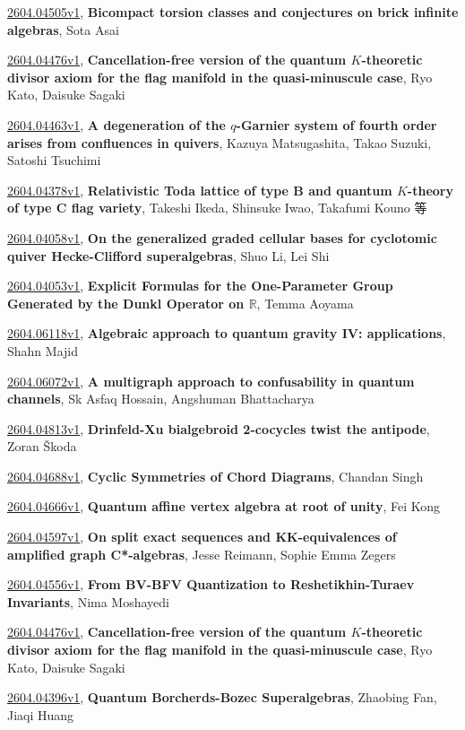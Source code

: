 \documentclass[9pt, a4paper]{article}
\theoremstyle{plain}
\theoremstyle{definition}
\theoremstyle{remark}
\newcommand{\arxiv}[3]{\href{https://arxiv.org/abs/#1}{#1}, \textbf{\textcolor{arxivblue}{#2}}, #3}
\begin{document}
\arxiv{2604.04505v1}{Bicompact torsion classes and conjectures on brick infinite algebras}{Sota Asai}

\arxiv{2604.04476v1}{Cancellation-free version of the quantum $K$-theoretic divisor axiom for the flag manifold in the quasi-minuscule case}{Ryo Kato, Daisuke Sagaki}

\arxiv{2604.04463v1}{A degeneration of the $q$-Garnier system of fourth order arises from confluences in quivers}{Kazuya Matsugashita, Takao Suzuki, Satoshi Tsuchimi}

\arxiv{2604.04378v1}{Relativistic Toda lattice of type B and quantum $K$-theory of type C flag variety}{Takeshi Ikeda, Shinsuke Iwao, Takafumi Kouno 等}

\arxiv{2604.04058v1}{On the generalized graded cellular bases for cyclotomic quiver Hecke-Clifford superalgebras}{Shuo Li, Lei Shi}

\arxiv{2604.04053v1}{Explicit Formulas for the One-Parameter Group Generated by the Dunkl Operator on $\mathbb{R}$}{Temma Aoyama}

\arxiv{2604.06118v1}{Algebraic approach to quantum gravity IV: applications}{Shahn Majid}

\arxiv{2604.06072v1}{A multigraph approach to confusability in quantum channels}{Sk Asfaq Hossain, Angshuman Bhattacharya}

\arxiv{2604.04813v1}{Drinfeld-Xu bialgebroid 2-cocycles twist the antipode}{Zoran Škoda}

\arxiv{2604.04688v1}{Cyclic Symmetries of Chord Diagrams}{Chandan Singh}

\arxiv{2604.04666v1}{Quantum affine vertex algebra at root of unity}{Fei Kong}

\arxiv{2604.04597v1}{On split exact sequences and KK-equivalences of amplified graph C*-algebras}{Jesse Reimann, Sophie Emma Zegers}

\arxiv{2604.04556v1}{From BV-BFV Quantization to Reshetikhin-Turaev Invariants}{Nima Moshayedi}

\arxiv{2604.04476v1}{Cancellation-free version of the quantum $K$-theoretic divisor axiom for the flag manifold in the quasi-minuscule case}{Ryo Kato, Daisuke Sagaki}

\arxiv{2604.04396v1}{Quantum Borcherds-Bozec Superalgebras}{Zhaobing Fan, Jiaqi Huang}

\end{document}
